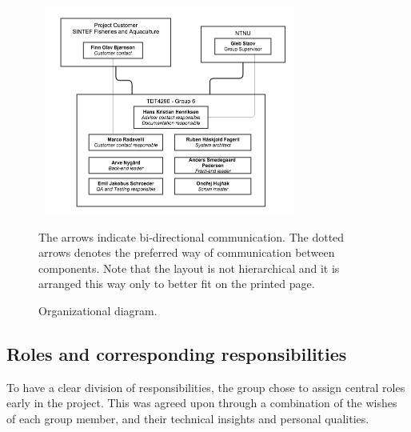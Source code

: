 \documentclass[11pt,a4paper,titlepage,oneside]{report}
\begin{document}
\begin{figure}[h]
\begin{center}
\includegraphics[height=260px,width=328px]{img/tdt4290_group_6_organizational_structure.png}
\caption{Organizational diagram.}
\label{fig:organizational-structure}
\medskip
\small
The arrows indicate bi-directional communication. The dotted arrows denotes the preferred way of communication between components. Note that the layout is not hierarchical and it is arranged this way only to better fit on the printed page.
\end{center}
\end{figure}

\subsection{Roles and corresponding responsibilities}
To have a clear division of responsibilities, the group chose to assign central roles early in the project. This was agreed upon through a combination of the wishes of each group member, and their technical insights and personal qualities. 
\end{document}
